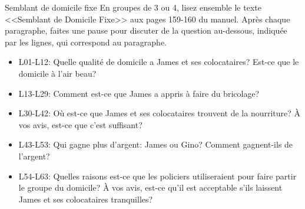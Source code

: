 \begin{frame}{Semblant de domicile fixe}
  \small
  En groupes de 3 ou 4, lisez ensemble le texte <<Semblant de Domicile Fixe>> aux pages 159-160 du manuel.
  Après chaque paragraphe, faites une pause pour discuter de la question au-dessous, indiquée par les lignes, qui correspond au paragraphe.
  \begin{itemize}
    \item[] L01-L12: Quelle qualité de domicile a James et ses colocataires? Est-ce que le domicile à l'air beau?
    \item[] L13-L29: Comment est-ce que James a appris à faire du bricolage?
    \item[] L30-L42: Où est-ce que James et ses colocataires trouvent de la nourriture? À vos avis, est-ce que c'est suffisant?
    \item[] L43-L53: Qui gagne plus d'argent: James ou Gino? Comment gagnent-ils de l'argent?
    \item[] L54-L63: Quelles raisons est-ce que les policiers utiliseraient pour faire partir le groupe du domicile? À vos avis, est-ce qu'il est acceptable s'ils laissent James et ses colocataires tranquilles?
  \end{itemize}
\end{frame}